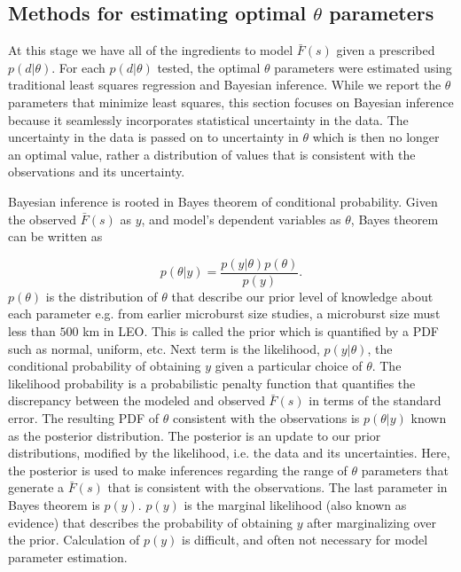 \documentclass[draft]{agujournal2019}
\begin{document}
\subsection{Methods for estimating optimal $\theta$ parameters}
At this stage we have all of the ingredients to model $\bar{F}(s)$ given a prescribed $p(d | \theta)$. For each $p(d | \theta)$ tested, the optimal $\theta$ parameters were estimated using traditional least squares regression and Bayesian inference. While we report the $\theta$ parameters that minimize least squares, this section focuses on Bayesian inference because it seamlessly incorporates statistical uncertainty in the data. The uncertainty in the data is passed on to uncertainty in $\theta$ which is then no longer an optimal value, rather a distribution of values that is consistent with the observations and its uncertainty. 

Bayesian inference is rooted in Bayes theorem of conditional probability. Given the observed $\bar{F}(s)$ as $y$, and model's dependent variables as $\theta$, Bayes theorem can be written as

\begin{equation}
p(\theta | y) = \frac{p(y | \theta) p(\theta)}{p(y)}.
\end{equation} $p(\theta)$ is the distribution of $\theta$ that describe our prior level of knowledge about each parameter e.g. from earlier microburst size studies, a microburst size must less than $500$ km in LEO. This is called the prior which is quantified by a PDF such as normal, uniform, etc. Next term is the likelihood, $p(y | \theta)$, the conditional probability of obtaining $y$ given a particular choice of $\theta$. The likelihood probability is a probabilistic penalty function that quantifies the discrepancy between the modeled and observed $\bar{F}(s)$ in terms of the standard error. The resulting PDF of $\theta$ consistent with the observations is $p(\theta | y)$ known as the posterior distribution. The posterior is an update to our prior distributions, modified by the likelihood, i.e. the data and its uncertainties. Here, the posterior is used to make inferences regarding the range of $\theta$ parameters that generate a $\bar{F}(s)$ that is consistent with the observations. The last parameter in Bayes theorem is $p(y)$. $p(y)$ is the marginal likelihood (also known as evidence) that describes the probability of obtaining $y$ after marginalizing over the prior. Calculation of $p(y)$ is difficult, and often not necessary for model parameter estimation. 
\end{document}
